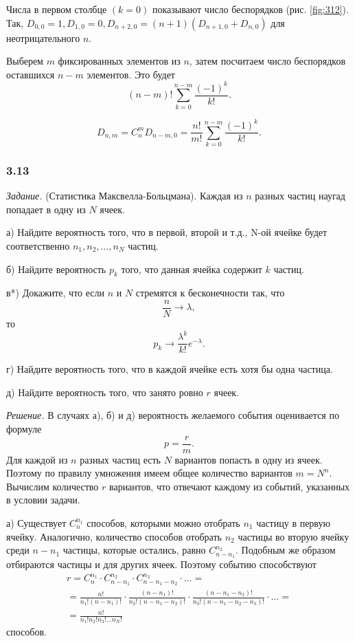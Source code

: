 \documentclass{book}
\begin{document}
Числа в первом столбце $ \left( k=0 \right) $ показывают число беспорядков (рис. \ref{fig:312}).
Так,
$D_{0, 0} = 1, D_{1, 0} = 0, D_{n+2, 0} = \left( n+1 \right) \left( D_{n+1, 0} + D_{n, 0} \right)$ для неотрицательного $n$.

Выберем $m$ фиксированных элементов из $n$, затем посчитаем число беспорядков оставшихся $n - m$ элементов.
Это будет
$$ \left( n-m \right)! \sum \limits_{k=0}^{n-m} \frac{ \left( -1 \right)^k}{k!}.$$

$$D_{n ,m} =
C_n^m D_{n-m, 0} =
\frac{n!}{m!} \sum \limits_{k=0}^{n-m} \frac{ \left( -1 \right)^k}{k!}.$$

\subsubsection*{3.13}

\textit{Задание.} (Статистика Максвелла-Больцмана). Каждая из $n$ разных частиц наугад попадает в одну из $N$ ячеек.

а) Найдите вероятность того, что в первой, второй и т.д., N-ой ячейке будет соответственно $n_1, n_2, \dotsc, n_N$ частиц.

б) Найдите вероятность $p_k$ того, что данная ячейка содержит $k$ частиц.

в*) Докажите, что если $n$ и $N$ стремятся к бесконечности так, что
$$ \frac{n}{N} \rightarrow \lambda,$$
то
$$p_k \rightarrow \frac{ \lambda^k}{k!}e^{- \lambda}.$$

г) Найдите вероятность того, что в каждой ячейке есть хотя бы одна частица.

д) Найдите вероятность того, что занято ровно $r$ ячеек.

\textit{Решение.} В случаях а), б) и д) вероятность желаемого события оценивается по формуле
$$p =
\frac{r}{m}.$$
Для каждой из $n$ разных частиц есть $N$ вариантов попасть в одну из ячеек.
Поэтому по правилу умножения имеем общее количество вариантов $m = N^n$.
Вычислим количество $r$ вариантов, что отвечают каждому из событий, указанных в условии задачи.

а) Существует $C_n^{n_1}$ способов, которыми можно отобрать $n_1$ частицу в первую ячейку.
Аналогично, количество способов отобрать $n_2$ частицы во вторую ячейку среди $n - n_1$ частицы, которые остались, равно $C_{n-n_1}^{n_2}$.
Подобным же образом отбираются частицы и для других ячеек.
Поэтому событию способствуют
\begin{equation*}
\begin{split}
r =
C_n^{n_1} \cdot C_{n-n_1}^{n_2} \cdot C_{n - n_1 - n_2}^{n_3} \cdot \dotsc = \\
= \frac{n!}{n_1! \left( n-n_1 \right)!}
\cdot \frac{ \left( n-n_1 \right)!}{n_2! \left( n - n_1 - n_2 \right)!}
\cdot \frac{ \left( n - n_1 - n_2 \right)!}{n_3! \left( n - n_1 - n_2 - n_3 \right)!} \cdot \dotsc = \\
= \frac{n!}{n_1! n_2! n_3! \dotsc n_N!}
\end{split}
\end{equation*}
способов.
\end{document}
